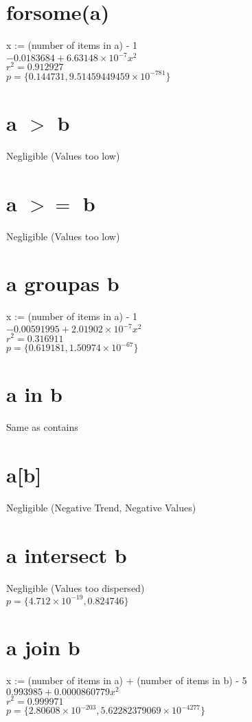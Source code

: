 \documentclass[12pt]{article}
\begin{document}
	\section{forsome(a)}
	x := (number of items in a) - 1\\
	$-0.0183684 + 6.63148 \times 10^{-7} x^2$\\
	$r^2 = 0.912927$\\
	$p = \{0.144731, 9.51459449459 \times 10^{-781}\}$
	
	\section{a $>$ b}
	Negligible (Values too low)
	
	\section{a $>=$ b}
	Negligible (Values too low)
	
	\section{a groupas b}
	x := (number of items in a) - 1\\
	$-0.00591995 + 2.01902 \times 10^{-7} x^2$\\
	$r^2 = 0.316911$\\
	$p = \{0.619181, 1.50974 \times 10^{-67}\}$
	
	\section{a in b}
	Same as contains
	
	\section{a[b]}
	Negligible (Negative Trend, Negative Values)
	
	\section{a intersect b}
	Negligible (Values too dispersed)\\
	$p = \{4.712 \times 10^{-19}, 0.824746\}$ %
	
	\section{a join b}
	x := (number of items in a) + (number of items in b) - 5\\
	$0.993985 + 0.0000860779 x^2$\\
	$r^2 = 0.999971$\\
	$p = \{2.80608 \times 10^{-203}, 5.62282379069 \times 10^{-4277}\}$
	
\end{document}
